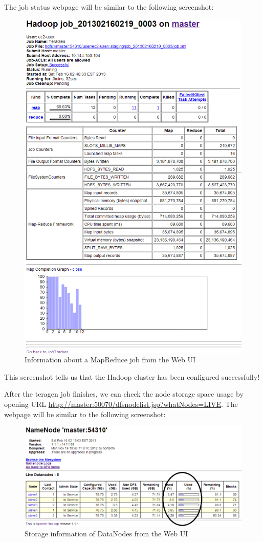 The job status webpage will be similar to the following screenshot: \\
\begin{figure}[h]
  \centering
  \includegraphics[width=.5\textwidth]{figs/5163OS_03_06.png}
  \caption{Information about a MapReduce job from the Web UI}\label{fig:mapreduce.job}
\end{figure} 


This screenshot tells us that the Hadoop cluster has been configured successfully!

After the teragen job finishes, we can check the node storage space usage by opening URL \url{http://master:50070/dfsnodelist.jsp?whatNodes=LIVE}. The webpage will be similar to the following screenshot: \\

\begin{figure}[h]
  \centering
  \includegraphics[width=.8\textwidth]{figs/5163OS_03_07.png}
  \caption{Storage information of DataNodes from the Web UI}\label{fig:hdfs.storage}
\end{figure} 

